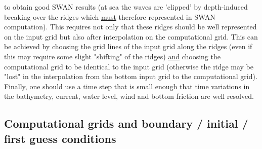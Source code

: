 \documentclass[12pt]{book}
\begin{document}
to obtain good SWAN results (at sea the waves are 'clipped' by depth-induced breaking over the ridges
which \underline{must} therefore represented in SWAN computation). This requires not only that these ridges
should be well represented on the input grid but also after interpolation on the computational grid. This
can be achieved by choosing the grid lines of the input grid along the ridges (even if this may require some
slight "shifting" of the ridges) \underline{and} choosing the computational grid to be identical to the
input grid (otherwise the ridge may be "lost" in the interpolation from the bottom input grid to the
computational grid).
\\[2ex]
\noindent
Finally, one should use a time step that is small enough that time variations in the bathymetry, current,
water level, wind and bottom friction are well resolved.

\subsection{Computational grids and boundary / initial / first guess conditions}
\label{sec:boundc}
\end{document}
